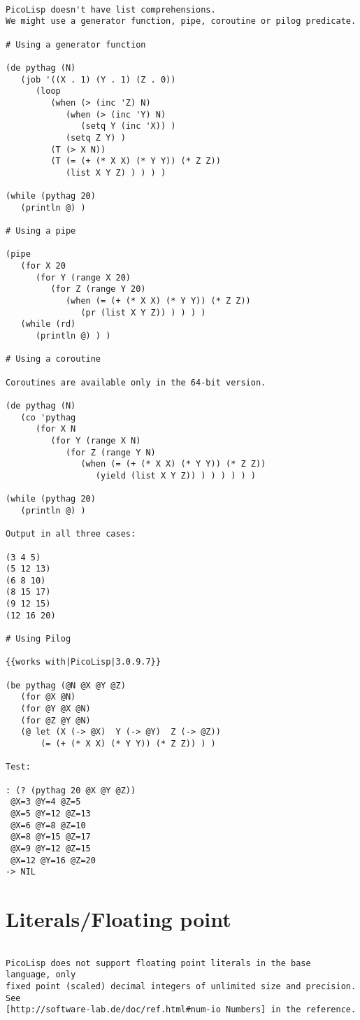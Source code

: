 \begin{verbatim}

PicoLisp doesn't have list comprehensions.
We might use a generator function, pipe, coroutine or pilog predicate.

# Using a generator function

(de pythag (N)
   (job '((X . 1) (Y . 1) (Z . 0))
      (loop
         (when (> (inc 'Z) N)
            (when (> (inc 'Y) N)
               (setq Y (inc 'X)) )
            (setq Z Y) )
         (T (> X N))
         (T (= (+ (* X X) (* Y Y)) (* Z Z))
            (list X Y Z) ) ) ) )

(while (pythag 20)
   (println @) )

# Using a pipe

(pipe
   (for X 20
      (for Y (range X 20)
         (for Z (range Y 20)
            (when (= (+ (* X X) (* Y Y)) (* Z Z))
               (pr (list X Y Z)) ) ) ) )
   (while (rd)
      (println @) ) )

# Using a coroutine

Coroutines are available only in the 64-bit version.

(de pythag (N)
   (co 'pythag
      (for X N
         (for Y (range X N)
            (for Z (range Y N)
               (when (= (+ (* X X) (* Y Y)) (* Z Z))
                  (yield (list X Y Z)) ) ) ) ) ) )

(while (pythag 20)
   (println @) )

Output in all three cases:

(3 4 5)
(5 12 13)
(6 8 10)
(8 15 17)
(9 12 15)
(12 16 20)

# Using Pilog

{{works with|PicoLisp|3.0.9.7}}

(be pythag (@N @X @Y @Z)
   (for @X @N)
   (for @Y @X @N)
   (for @Z @Y @N)
   (@ let (X (-> @X)  Y (-> @Y)  Z (-> @Z))
       (= (+ (* X X) (* Y Y)) (* Z Z)) ) )

Test:

: (? (pythag 20 @X @Y @Z))
 @X=3 @Y=4 @Z=5
 @X=5 @Y=12 @Z=13
 @X=6 @Y=8 @Z=10
 @X=8 @Y=15 @Z=17
 @X=9 @Y=12 @Z=15
 @X=12 @Y=16 @Z=20
-> NIL

\end{verbatim}

\section*{Literals/Floating point}

\begin{verbatim}

PicoLisp does not support floating point literals in the base language, only
fixed point (scaled) decimal integers of unlimited size and precision. See
[http://software-lab.de/doc/ref.html#num-io Numbers] in the reference.

\end{verbatim}

